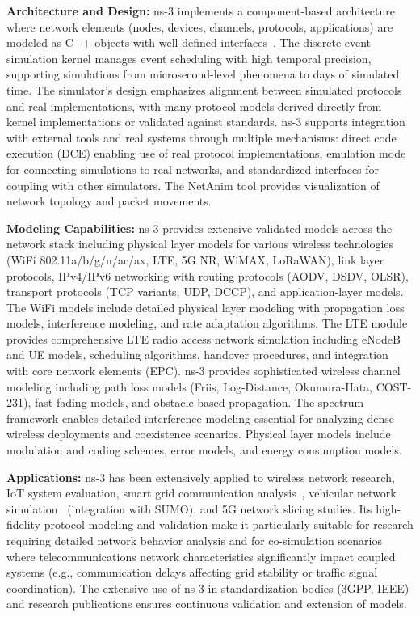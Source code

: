 \textbf{Architecture and Design:} ns-3 implements a component-based architecture where network elements (nodes, devices, channels, protocols, applications) are modeled as C++ objects with well-defined interfaces~\cite{ns3_application}. The discrete-event simulation kernel manages event scheduling with high temporal precision, supporting simulations from microsecond-level phenomena to days of simulated time. The simulator's design emphasizes alignment between simulated protocols and real implementations, with many protocol models derived directly from kernel implementations or validated against standards. ns-3 supports integration with external tools and real systems through multiple mechanisms: direct code execution (DCE) enabling use of real protocol implementations, emulation mode for connecting simulations to real networks, and standardized interfaces for coupling with other simulators. The NetAnim tool provides visualization of network topology and packet movements.

\textbf{Modeling Capabilities:} ns-3 provides extensive validated models across the network stack including physical layer models for various wireless technologies (WiFi 802.11a/b/g/n/ac/ax, LTE, 5G NR, WiMAX, LoRaWAN), link layer protocols, IPv4/IPv6 networking with routing protocols (AODV, DSDV, OLSR), transport protocols (TCP variants, UDP, DCCP), and application-layer models. The WiFi models include detailed physical layer modeling with propagation loss models, interference modeling, and rate adaptation algorithms. The LTE module~\cite{ns3_lte_application} provides comprehensive LTE radio access network simulation including eNodeB and UE models, scheduling algorithms, handover procedures, and integration with core network elements (EPC). ns-3 provides sophisticated wireless channel modeling including path loss models (Friis, Log-Distance, Okumura-Hata, COST-231), fast fading models, and obstacle-based propagation. The spectrum framework enables detailed interference modeling essential for analyzing dense wireless deployments and coexistence scenarios. Physical layer models include modulation and coding schemes, error models, and energy consumption models.

\textbf{Applications:} ns-3 has been extensively applied to wireless network research, IoT system evaluation, smart grid communication analysis~\cite{ns3_smartgrid}, vehicular network simulation~\cite{ns3_vanet} (integration with SUMO), and 5G network slicing studies. Its high-fidelity protocol modeling and validation make it particularly suitable for research requiring detailed network behavior analysis and for co-simulation scenarios where telecommunications network characteristics significantly impact coupled systems (e.g., communication delays affecting grid stability or traffic signal coordination). The extensive use of ns-3 in standardization bodies (3GPP, IEEE) and research publications ensures continuous validation and extension of models.


